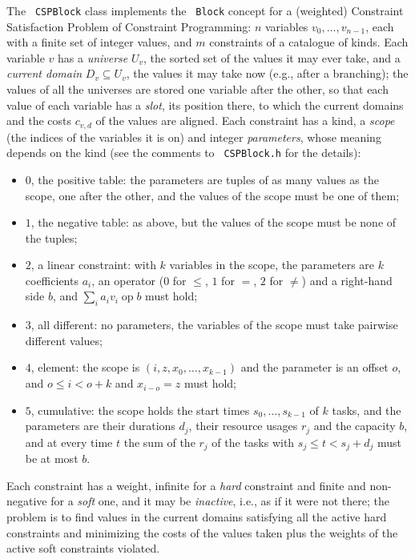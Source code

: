 \documentclass[a4paper]{article}
\newcommand{\code}[1]{\textrm{\texttt{\hyphenchar\font=200 #1}}}
\def\Block{\code{Block}\xspace}
\begin{document}
The \code{CSPBlock} class implements the \Block concept for a (weighted) Constraint Satisfaction Problem of Constraint Programming: $n$ variables $v_0 , \ldots , v_{n-1}$, each with a finite set of integer values, and $m$ constraints of a catalogue of kinds. Each variable $v$ has a \emph{universe} $U_v$, the sorted set of the values it may ever take, and a \emph{current domain} $D_v \subseteq U_v$, the values it may take now (e.g., after a branching); the values of all the universes are stored one variable after the other, so that each value of each variable has a \emph{slot}, its position there, to which the current domains and the costs $c_{v,d}$ of the values are aligned. Each constraint has a kind, a \emph{scope} (the indices of the variables it is on) and integer \emph{parameters}, whose meaning depends on the kind (see the comments to \code{CSPBlock.h} for the details):
%
\begin{itemize}
 \item $0$, the positive table: the parameters are tuples of as many values as the scope, one after the other, and the values of the scope must be one of them;
 \item $1$, the negative table: as above, but the values of the scope must be none of the tuples;
 \item $2$, a linear constraint: with $k$ variables in the scope, the parameters are $k$ coefficients $a_i$, an operator ($0$ for $\leq$, $1$ for $=$, $2$ for $\neq$) and a right-hand side $b$, and $\sum_i a_i v_i \;\mathrm{op}\; b$ must hold;
 \item $3$, all different: no parameters, the variables of the scope must take pairwise different values;
 \item $4$, element: the scope is $( i , z , x_0 , \ldots , x_{k-1} )$ and the parameter is an offset $o$, and $o \leq i < o + k$ and $x_{i-o} = z$ must hold;
 \item $5$, cumulative: the scope holds the start times $s_0 , \ldots , s_{k-1}$ of $k$ tasks, and the parameters are their durations $d_j$, their resource usages $r_j$ and the capacity $b$, and at every time $t$ the sum of the $r_j$ of the tasks with $s_j \leq t < s_j + d_j$ must be at most $b$.
\end{itemize}
%
Each constraint has a weight, infinite for a \emph{hard} constraint and finite and non-negative for a \emph{soft} one, and it may be \emph{inactive}, i.e., as if it were not there; the problem is to find values in the current domains satisfying all the active hard constraints and minimizing the costs of the values taken plus the weights of the active soft constraints violated.
\end{document}
